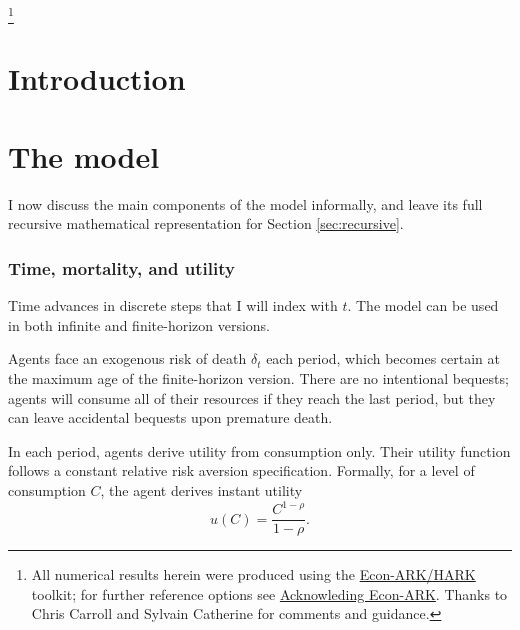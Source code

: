 \documentclass[./RiskyContrib.tex]{subfiles}
\begin{document}
\begin{authorsinfo}
\end{authorsinfo}

\thanks{All numerical results herein were produced using the \href{https://econ-ark/HARK}{Econ-ARK/HARK} toolkit; for further reference options see \href{https://econ-ark.org/acknowledging/}{Acknowleding Econ-ARK}.  Thanks to Chris Carroll and Sylvain Catherine for comments and guidance.}

\titlepagefinish

\newtheorem{defn}{Definition}
\newtheorem{theorem}{Theorem}

\hypertarget{Introduction}{}
\section{Introduction}



\hypertarget{The model}{}
\section{The model}

I now discuss the main components of the model informally, and leave its full
recursive mathematical representation for Section \ref{sec:recursive}.

\subsubsection{Time, mortality, and utility}

Time advances in discrete steps that I will index with $t$. The model can
be used in both infinite and finite-horizon versions.

Agents face an exogenous risk of death $\delta_t$ each period, which becomes certain at the 
maximum age of the finite-horizon version. There are no intentional bequests; agents
will consume all of their resources if they reach the last period, but they can leave
accidental bequests upon premature death.

In each period, agents derive utility from consumption only. Their utility function
follows a constant relative risk aversion specification. Formally, for a level of 
consumption $C$, the agent derives instant utility
\begin{equation}
	u(C) = \frac{C^{1-\rho}}{1- \rho}.
\end{equation}
\end{document}
